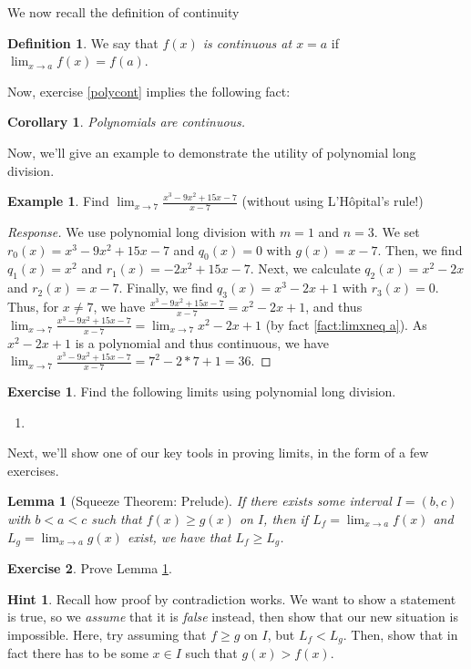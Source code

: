 \documentclass[english]{book}
\newtheorem{corollary}[theorem]{Corollary}
\newtheorem{lemma}[theorem]{Lemma}
\theoremstyle{remark}
\theoremstyle{definition}
\newtheorem{excs}{Exercise}[chapter]
\newtheorem{hint}{Hint}[excs]
\newtheorem{exle}[theorem]{Example}
\newtheorem{definition}[theorem]{Definition}
\newtheorem*{next week}{Next Week}
\newcommand{\dlim}{\displaystyle\lim}
\begin{document}
We now recall the definition of continuity
\begin{definition}
	We say that \emph{$f(x)$ is continuous at $x=a$} if $\dlim_{x\to a}f(x)=f(a)$.
\end{definition}
Now, exercise \ref{polycont} implies the following fact:
\begin{corollary}
	Polynomials are continuous.
\end{corollary}
Now, we'll give an example to demonstrate the utility of polynomial long division.
\begin{exle}\label{exle:pldlim}
	Find $\dlim_{x\to 7} \frac{x^3-9x^2+15x-7}{x-7}$ (without using L'H\^opital's rule!)
\end{exle}
\begin{proof}[Response]
We use polynomial long division with $m=1$ and $n=3$. We set $r_0(x)=x^3-9x^2+15x-7$ and $q_0(x)=0$ with $g(x)=x-7$. Then, we find $q_1(x)=x^2$ and $r_1(x)=-2x^2+15x-7$. Next, we calculate $q_2(x)=x^2-2x$ and $r_2(x)=x-7$. Finally, we find $q_3(x)=x^3-2x+1$ with $r_3(x)=0$. Thus, for $x\neq 7$, we have $\frac{x^3-9x^2+15x-7}{x-7}=x^2-2x+1$, and thus $\dlim_{x\to 7}\frac{x^3-9x^2+15x-7}{x-7}=\dlim_{x\to 7}x^2-2x+1$ (by fact \ref{fact:limxneq a}). As $x^2-2x+1$ is a polynomial and thus continuous, we have $\dlim_{x\to 7}\frac{x^3-9x^2+15x-7}{x-7}=7^2-2*7+1=36$.
\end{proof}
\begin{excs}
	Find the following limits using polynomial long division.\begin{enumerate}[label=\textit{(\alph*)}]
\item{}
	\end{enumerate}
\end{excs}
Next, we'll show one of our key tools in proving limits, in the form of a few exercises.
\begin{lemma}[Squeeze Theorem: Prelude]\label{lem:presqz}
	If there exists some interval $I=(b,c)$ with $b<a<c$ such that $f(x)\geq g(x)$ on $I$, then if $L_f=\dlim_{x\to a}f(x)$ and $L_g=\dlim_{x\to a}g(x)$ exist, we have that $L_f\geq L_g$.
\end{lemma}
\begin{excs}\label{excs:presqz}
Prove Lemma \ref{lem:presqz}.
\end{excs}
\begin{hint}
	Recall how proof by contradiction works. We want to show a statement is true, so we \emph{assume} that it is \emph{false} instead, then show that our new situation is impossible. Here, try assuming that $f\geq g$ on $I$, but $L_f<L_g$. Then, show that in fact there has to be some $x\in I$ such that $g(x)>f(x)$.
\end{hint}
\end{document}
